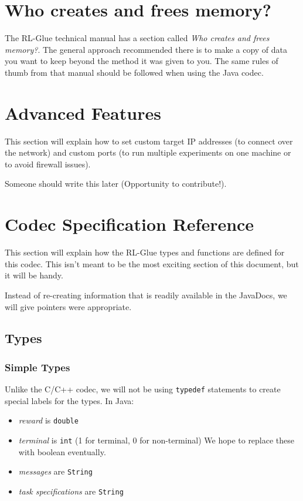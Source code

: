 \documentclass[11pt]{article}
\begin{document}
\section{Who creates and frees memory?}
The RL-Glue technical manual has a section called \textit{Who creates and frees memory?}.  The general approach recommended there is to make a copy of data
you want to keep beyond the method it was given to you.  The same rules of thumb from that manual should be followed when using the Java codec.


\section{Advanced Features}
This section will explain how to set custom target IP addresses (to connect over the network) and custom ports (to run multiple experiments on one machine or to avoid firewall issues).

Someone should write this later (Opportunity to contribute!).

\section{Codec Specification Reference}
This section will explain how the RL-Glue types and functions are defined for this codec.  This isn't meant to be the most exciting section of this document, but it will
be handy.

Instead of re-creating information that is readily available in the JavaDocs, we will give pointers were appropriate.

\subsection{Types}


\subsubsection{Simple Types}
Unlike the C/C++ codec, we will not be using \texttt{typedef} statements to create special labels for the types. In Java:
\begin{itemize}
	\item \textit{reward} is \texttt{double}
	\item \textit{terminal} is \texttt{int} (1 for terminal, 0 for non-terminal) We hope to replace these with boolean eventually.
	\item \textit{messages} are \texttt{String}
	\item \textit{task specifications} are \texttt{String}
\end{itemize}
\end{document}
